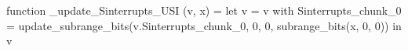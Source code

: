 function _update_Sinterrupts_USI (v, x) = let v = { v with Sinterrupts_chunk_0 = update_subrange_bits(v.Sinterrupts_chunk_0, 0, 0, subrange_bits(x, 0, 0)) } in
  v

